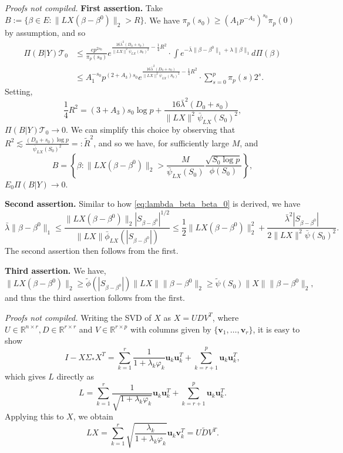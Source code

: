 \documentclass[11pt]{article}
\renewenvironment{proof}[1]{\par\noindent{\bf #1 \ }}{\hfill\BlackBox\\[2mm]}
\renewenvironment{proof}[1]{\textit{Proofs not compiled.}}{}
\newcommand{\R}{\mathbb{R}}
\newcommand{\bezero}{\beta^0}
\newcommand{\postCov}{\Sigma_*}
\numberwithin{equation}{section}
\begin{document}
\begin{proof}{Proof of Theorem \ref{thm:recovery}.}
{\bf First assertion.} Take $B := \{\beta \in E : \|LX(\beta - \bezero)\|_2  > R\}$. We have $\pi_p(s_0) \geq (A_1 p^{-A_3})^{s_0}\pi_p(0)$ by assumption, and so
\begin{align*}
\Pi(B | Y)\mathcal{T}_0 &\leq \frac{e p^{2s_0}}{\pi_p(s_0)}e^{\frac{16\bar{\lambda}^2(D_0 + s_0)}{\|LX\|^2\bar{\psi}_{LX}(S_0)^2}-\frac{1}{4}R^2} \cdot \int e^{-\bar{\lambda}\|\beta - \bezero\|_1 + \lambda\|\beta\|_1}d\Pi(\beta) \\
&\leq A_1^{-s_0}p^{(2+A_3)s_0}e^{\frac{16\bar{\lambda}^2(D_0 + s_0)}{\|LX\|^2\bar{\psi}_{LX}(S_0)^2}-\frac{1}{4}R^2} \cdot \sum_{s=0}^p \pi_p(s)2^s.
\end{align*}
Setting,
$$
\frac{1}{4}R^2 = (3+A_3)s_0 \log p + \frac{16\bar{\lambda}^2(D_0 + s_0)}{\|LX\|^2\bar{\psi}_{LX}(S_0)^2},
$$
$\Pi(B | Y)\mathcal{T}_0 \rightarrow 0$. We can simplify this choice by observing that $R^2 \lesssim \frac{(D_0 + s_0)\log p}{\bar{\psi}_{LX}(S_0)^2} =: \tilde{R}^2$, and so we have, for sufficiently large $M$, and 
$$B = \left\{\beta : \|LX(\beta - \bezero)\|_2 > \frac{M}{\bar{\psi}_{LX}(S_0)} \frac{\sqrt{S_0 \log p}}{\phi(S_0)} \right\},$$
$E_0 \Pi(B | Y) \rightarrow 0$.

{\bf Second assertion.} Similar to how \eqref{eq:lambda_beta_beta_0} is derived, we have
$$
\bar{\lambda} \|\beta - \bezero\|_1 \leq \frac{\|LX(\beta - \bezero)\|_2|S_{\beta - \bezero}|^{1/2}}{\|LX\| \bar{\phi}_{LX}(|S_{\beta - \bezero}|)} \leq \frac{1}{2}\|LX(\beta - \bezero)\|_2^2 + \frac{\bar{\lambda}^2|S_{\beta - \bezero}|}{2\|LX\|^2 \bar{\psi}(S_0)^2}.
$$
The second assertion then follows from the first.

{\bf Third assertion.} We have,
$$
\|LX(\beta - \bezero)\|_2 \geq \tilde{\phi}(|S_{\beta - \bezero}|)\|LX\|\|\beta - \bezero\|_2 \geq \tilde{\psi}(S_0)\|X\| \|\beta - \bezero\|_2, 
$$
and thus the third assertion follows from the first.
\end{proof}

\begin{proof}{Proof of Lemma \ref{lem:L_and_LX}}
Writing the SVD of $X$ as $X = UDV^T$, where $U \in \R^{n \times r}, D \in \R^{r \times r}$ and $V \in \R^{r \times p}$ with columns given by $\{\mathbf{v}_1, \dots, \mathbf{v}_r\}$, it is easy to show
	$$
	I - X\postCov  X^T = \sum_{k = 1}^r \frac{1}{1+\lambda_k \varphi_k} \mathbf{u}_k \mathbf{u}_k^T + \sum_{k = r + 1}^p \mathbf{u}_k \mathbf{u}_k^T,
	$$
	which gives $L$ directly as
	$$
	L = \sum_{k = 1}^r \frac{1}{\sqrt{1+\lambda_k \varphi_k}} \mathbf{u}_k \mathbf{u}_k^T + \sum_{k = r + 1}^p \mathbf{u}_k \mathbf{u}_k^T.
	$$
	Applying this to $X$, we obtain
	$$
	LX = \sum_{k = 1}^r \sqrt{\frac{\lambda_k}{1+\lambda_k \varphi_k}} \mathbf{u}_k \mathbf{v}_k^T = U \tilde{D} V^T.
	$$
\end{proof}
\end{document}

